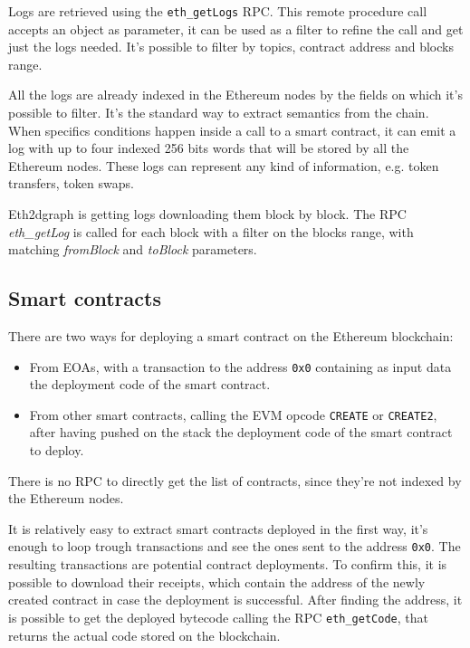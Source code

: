 Logs are retrieved using the \texttt{eth\_getLogs} RPC. This remote procedure call accepts an object as parameter, it can be used as a filter to refine the call and get just the logs needed. It's possible to filter by topics, contract address and blocks range. 

All the logs are already indexed in the Ethereum nodes by the fields on which it's possible to filter. It's the standard way to extract semantics from the chain. When specifics conditions happen inside a call to a smart contract, it can emit a log with up to four indexed 256 bits words that will be stored by all the Ethereum nodes. These logs can represent any kind of information, e.g. token transfers, token swaps.

Eth2dgraph is getting logs downloading them block by block. The RPC \textit{eth\_getLog} is called for each block with a filter on the blocks range, with matching \textit{fromBlock} and \textit{toBlock} parameters.

\subsection{Smart contracts}

There are two ways for deploying a smart contract on the Ethereum blockchain: 

\begin{itemize}
    \item From EOAs, with a transaction to the address \texttt{0x0} containing as input data the deployment code of the smart contract.
    \item From other smart contracts, calling the EVM opcode \texttt{CREATE} or \texttt{CREATE2}, after having pushed on the stack the deployment code of the smart contract to deploy.
\end{itemize}

There is no RPC to directly get the list of contracts, since they're not indexed by the Ethereum nodes.

It is relatively easy to extract smart contracts deployed in the first way, it's enough to loop trough transactions and see the ones sent to the address \texttt{0x0}. The resulting transactions are potential contract deployments. To confirm this, it is possible to download their receipts, which contain the address of the newly created contract in case the deployment is successful. After finding the address, it is possible to get the deployed bytecode calling the RPC \texttt{eth\_getCode}, that returns the actual code stored on the blockchain.

